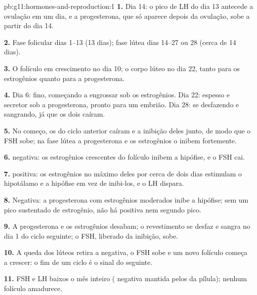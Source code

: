 \begin{solution}{pb:g11:hormones-and-reproduction:1}
\textbf{1.} Dia 14: o pico de LH do dia 13 antecede a ovulação em um
dia, e a progesterona, que só aparece depois da ovulação, sobe a partir
do dia 14.

\textbf{2.} Fase folicular dias 1--13 (13 dias); fase lútea dias 14--27
ou 28 (cerca de 14 dias).

\textbf{3.} O folículo em crescimento no dia 10; o corpo lúteo no dia
22, tanto para os estrogênios quanto para a progesterona.

\textbf{4.} Dia 6: fino, começando a engrossar sob os estrogênios. Dia
22: espesso e secretor sob a progesterona, pronto para um embrião. Dia
28: se desfazendo e sangrando, já que os dois  caíram.

\textbf{5.} No começo, os  do ciclo anterior caíram e a
inibição deles junto, de modo que o FSH sobe; na fase lútea a
progesterona e os estrogênios o inibem fortemente.

\textbf{6.}  negativa: os estrogênios crescentes do
folículo inibem a hipófise, e o FSH cai.

\textbf{7.}  positiva: os estrogênios no máximo deles
por cerca de dois dias estimulam o hipotálamo e a hipófise em vez de
inibi-los, e o LH dispara.

\textbf{8.} Negativa: a progesterona com estrogênios moderados inibe a
hipófise; sem um pico sustentado de estrogênio, não há
 positiva nem segundo pico.

\textbf{9.} A progesterona e os estrogênios desabam; o revestimento se
desfaz e sangra no dia 1 do ciclo seguinte; o FSH, liberado da
inibição, sobe.

\textbf{10.} A queda dos  lúteos retira a 
negativa, o FSH sobe e um novo folículo começa a crescer: o fim de um
ciclo é o sinal do seguinte.

\textbf{11.} FSH e LH baixos o mês inteiro ( negativa
mantida pelos  da pílula); nenhum folículo amadurece.


\end{solution}
